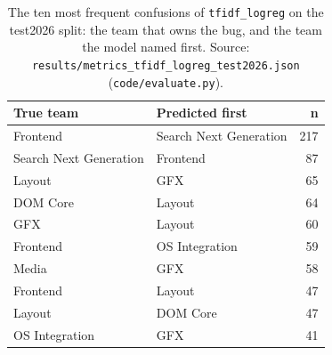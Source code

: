 \begin{table}[t]\centering
\small
\caption{The ten most frequent confusions of \texttt{tfidf\_logreg} on the test2026 split: the team that owns the bug, and the team the model named first. Source: \texttt{results/metrics\_tfidf\_logreg\_test2026.json} (\texttt{code/evaluate.py}).}
\label{tab:confusions-test2026}
\begin{tabular}{llr}
\toprule
True team & Predicted first & n \\
\midrule
Frontend & Search Next Generation & 217 \\
Search Next Generation & Frontend & 87 \\
Layout & GFX & 65 \\
DOM Core & Layout & 64 \\
GFX & Layout & 60 \\
Frontend & OS Integration & 59 \\
Media & GFX & 58 \\
Frontend & Layout & 47 \\
Layout & DOM Core & 47 \\
OS Integration & GFX & 41 \\
\bottomrule
\end{tabular}
\end{table}
